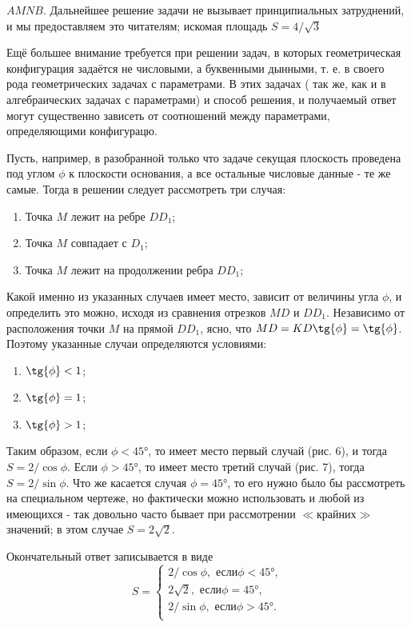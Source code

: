 \twocolumn
$AMNB$. Дальнейшее решение задачи не вызывает принципиальных затруднений, и мы предоставляем это читателям; искомая площадь $S = 4/\sqrt{3}$

Ещё большее внимание требуется при решении задач, в которых геометрическая конфигурация задаётся не числовыми, а буквенными дынными, т. е. в своего рода геометрических задачах с параметрами. В этих задачах ( так же, как и в алгебраических задачах с параметрами) и способ решения, и получаемый ответ могут существенно зависеть от соотношений между параметрами, определяющими конфигурацю.

Пусть, например, в разобранной только что задаче секущая плоскость проведена под углом $\phi$ к плоскости основания, а все остальные числовые данные - те же самые. Тогда в решении следует рассмотреть три случая:
\begin{enumerate}[noitemsep]
	\item Точка $M$ лежит на ребре $DD_1$;
	\item Точка $M$ совпадает с $D_1$;
	\item Точка $M$ лежит на продолжении ребра $DD_1$;
\end{enumerate}

Какой именно из указанных случаев имеет место, зависит от величины угла $\phi$, и определить это можно, исходя из сравнения отрезков $MD$ и $DD_1$. Независимо от расположения точки $M$ на прямой $DD_1$, ясно, что $MD = KD \tg{\phi} = \tg{\phi}$. Поэтому указанные случаи определяются условиями:
\begin{enumerate}[noitemsep]
	\item $\tg{\phi} < 1$;
	\item $\tg{\phi} = 1$;
	\item $\tg{\phi} > 1$;
\end{enumerate}

Таким образом, если $\phi < 45°$, то имеет место первый случай (рис. 6), и тогда $S = 2/\cos{\phi}$. Если $\phi > 45°$, то имеет место третий случай (рис. 7), тогда $S = 2/\sin{\phi}$. Что же касается случая $\phi = 45°$, то его нужно было бы рассмотреть на специальном чертеже, но фактически можно использовать и любой из имеющихся - так довольно часто бывает при рассмотрении $\ll$крайних$\gg$ значений; в этом случае $S = 2\sqrt{2}$.

Окончательный ответ записывается в виде  
\[	S =
	\begin{cases}
		2/\cos{\phi}, \text{ если} \phi < 45°, \\
		2\sqrt{2}, \text{ если} \phi = 45°,\\
		2/\sin{\phi}, \text{ если} \phi > 45°.\\
	\end{cases}
\]


